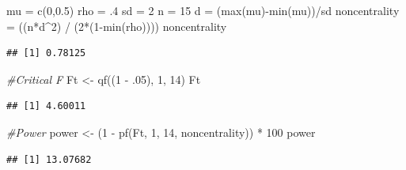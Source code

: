 \documentclass[
]{book}
\newenvironment{Shaded}{\begin{snugshade}}{\end{snugshade}}
\newcommand{\CommentTok}[1]{\textcolor[rgb]{0.56,0.35,0.01}{\textit{#1}}}
\newcommand{\DecValTok}[1]{\textcolor[rgb]{0.00,0.00,0.81}{#1}}
\newcommand{\FloatTok}[1]{\textcolor[rgb]{0.00,0.00,0.81}{#1}}
\newcommand{\FunctionTok}[1]{\textcolor[rgb]{0.00,0.00,0.00}{#1}}
\newcommand{\NormalTok}[1]{#1}
\newcommand{\OtherTok}[1]{\textcolor[rgb]{0.56,0.35,0.01}{#1}}
\newcommand{\SpecialCharTok}[1]{\textcolor[rgb]{0.00,0.00,0.00}{#1}}
\begin{document}
\begin{Shaded}
\begin{Highlighting}[]
\NormalTok{mu }\OtherTok{=} \FunctionTok{c}\NormalTok{(}\DecValTok{0}\NormalTok{,}\FloatTok{0.5}\NormalTok{)}
\NormalTok{rho }\OtherTok{=}\NormalTok{ .}\DecValTok{4}
\NormalTok{sd }\OtherTok{=} \DecValTok{2}
\NormalTok{n }\OtherTok{=} \DecValTok{15}
\NormalTok{d }\OtherTok{=}\NormalTok{ (}\FunctionTok{max}\NormalTok{(mu)}\SpecialCharTok{{-}}\FunctionTok{min}\NormalTok{(mu))}\SpecialCharTok{/}\NormalTok{sd}
\NormalTok{noncentrality }\OtherTok{=}\NormalTok{ ((n}\SpecialCharTok{*}\NormalTok{d}\SpecialCharTok{\^{}}\DecValTok{2}\NormalTok{) }\SpecialCharTok{/}\NormalTok{ (}\DecValTok{2}\SpecialCharTok{*}\NormalTok{(}\DecValTok{1}\SpecialCharTok{{-}}\FunctionTok{min}\NormalTok{(rho))))}
\NormalTok{noncentrality}
\end{Highlighting}
\end{Shaded}

\begin{verbatim}
## [1] 0.78125
\end{verbatim}

\begin{Shaded}
\begin{Highlighting}[]
\CommentTok{\#Critical F}
\NormalTok{Ft }\OtherTok{\textless{}{-}} \FunctionTok{qf}\NormalTok{((}\DecValTok{1} \SpecialCharTok{{-}}\NormalTok{ .}\DecValTok{05}\NormalTok{), }\DecValTok{1}\NormalTok{, }\DecValTok{14}\NormalTok{)}
\NormalTok{Ft}
\end{Highlighting}
\end{Shaded}

\begin{verbatim}
## [1] 4.60011
\end{verbatim}

\begin{Shaded}
\begin{Highlighting}[]
\CommentTok{\#Power}
\NormalTok{power }\OtherTok{\textless{}{-}}\NormalTok{ (}\DecValTok{1} \SpecialCharTok{{-}} \FunctionTok{pf}\NormalTok{(Ft,}
                 \DecValTok{1}\NormalTok{,}
                 \DecValTok{14}\NormalTok{,}
\NormalTok{                 noncentrality)) }\SpecialCharTok{*} \DecValTok{100}
\NormalTok{power}
\end{Highlighting}
\end{Shaded}

\begin{verbatim}
## [1] 13.07682
\end{verbatim}
\end{document}
